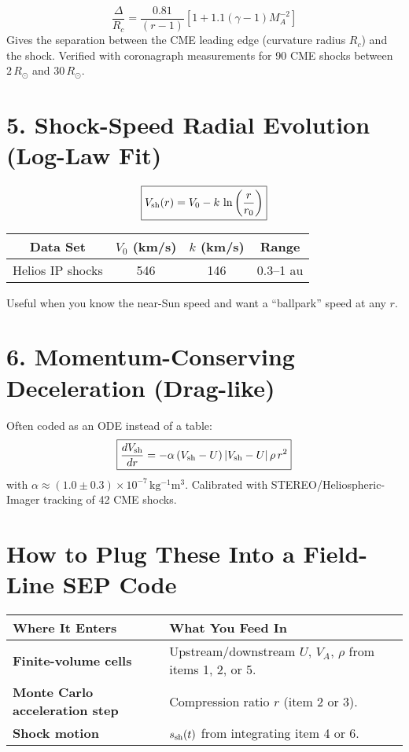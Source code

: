 \[
\boxed{\frac{\Delta}{R_c} = \frac{0.81}{(r-1)}\left[1 + 1.1(\gamma-1)M_A^{-2}\right]}
\]
Gives the separation between the CME leading edge (curvature radius $R_c$) and the shock. Verified with coronagraph measurements for 90 CME shocks between $2\,R_\odot$ and $30\,R_\odot$.

\hrulefill

\section*{5. Shock-Speed Radial Evolution (Log-Law Fit)}

\[
\boxed{V_{\rm sh}(r) = V_0 - k\,\ln\left(\frac{r}{r_0}\right)}
\]

\begin{center}
\begin{tabular}{@{}cccc@{}}
\toprule
\textbf{Data Set} & \textbf{$V_0$ (km/s)} & \textbf{$k$ (km/s)} & \textbf{Range} \\
\midrule
Helios IP shocks & 546 & 146 & 0.3–1 au \\
\bottomrule
\end{tabular}
\end{center}

Useful when you know the near-Sun speed and want a ``ballpark'' speed at any $r$.

\hrulefill

\section*{6. Momentum-Conserving Deceleration (Drag-like)}

Often coded as an ODE instead of a table:
\[
\boxed{\frac{dV_{\rm sh}}{dr} = -\alpha\,(V_{\rm sh} - U)\,|V_{\rm sh} - U|\,\rho\,r^2}
\]
with $\alpha \approx (1.0 \pm 0.3) \times 10^{-7}\,\mathrm{kg^{-1}m^3}$. Calibrated with STEREO/Heliospheric-Imager tracking of 42 CME shocks.

\hrulefill

\section*{How to Plug These Into a Field-Line SEP Code}

\begin{center}
\begin{tabular}{@{}p{5cm}p{8cm}@{}}
\toprule
\textbf{Where It Enters} & \textbf{What You Feed In} \\
\midrule
\textbf{Finite-volume cells} & Upstream/downstream $U$, $V_A$, $\rho$ from items 1, 2, or 5. \\
\textbf{Monte Carlo acceleration step} & Compression ratio $r$ (item 2 or 3). \\
\textbf{Shock motion} & $s_{\rm sh}(t)$ from integrating item 4 or 6. \\
\bottomrule
\end{tabular}
\end{center}

